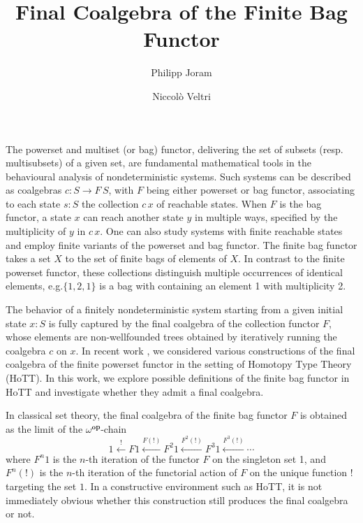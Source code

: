 \documentclass{easychair}
\begin{document}
  \title{Final Coalgebra of the Finite Bag Functor}
  \author{%
      Philipp Joram \and
      Niccol{\`o} Veltri
  }

  \maketitle

  The powerset and multiset (or bag) functor, delivering the set of
  subsets (resp. multisubsets) of a given set, are fundamental
  mathematical tools in the behavioural analysis of nondeterministic
  systems. Such systems can be described as coalgebras $c : S \to
  F\, S$, with $F$ being either powerset or bag functor, associating
  to each state $s : S$ the collection $c \, x$ of reachable
  states. When $F$ is the bag functor, a state $x$ can reach
  another state $y$ in multiple ways, specified by the multiplicity of
  $y$ in $c\,x$. One can also study systems with finite reachable
  states and employ finite variants of the powerset and bag functor.
  The finite bag functor takes a set $X$ to the set of finite
  bags of elements of $X$.  In contrast to the finite powerset
  functor, these collections distinguish multiple occurrences of
  identical elements, e.g.\@ $\{1, 2, 1\}$ is a bag with containing an element
  1 with multiplicity 2.
  
  The behavior of a finitely nondeterministic system starting from a
  given initial state $x : S$ is fully captured by the final coalgebra
  of the collection functor $F$, whose elements are non-wellfounded
  trees obtained by iteratively running the coalgebra $c$ on $x$. In
  recent work \cite{Veltri2021}, we considered various constructions
  of the final coalgebra of the finite powerset functor in the setting
  of Homotopy Type Theory (HoTT). In this work, we explore possible
  definitions of the finite bag functor in HoTT and investigate
  whether they admit a final coalgebra.

  In classical set theory, the final coalgebra of the finite bag
  functor $F$ is obtained as the limit of the
  $\omega^{\operatorname{\mathbf{op}}}$-chain
  \cite[{Ch. 3.3.13}]{Adamek2021}
  \begin{equation}\label{eq:chain}
    1 \xleftarrow{!} {F 1}
      \xleftarrow{F(!)} {F^2 1}
      \xleftarrow{F^2(!)} {F^3 1}
      \xleftarrow{F^3(!)}
      \cdots
  \end{equation}
  where $F^n 1$ is the $n$-th iteration of the functor $F$ on the
  singleton set 1, and $F^n(!)$ is the $n$-th iteration of the
  functorial action of $F$ on the unique function $!$ targeting the set
  $1$. In a constructive environment such as HoTT, it is not
  immediately obvious whether this construction still produces the
  final coalgebra or not.
\end{document}
